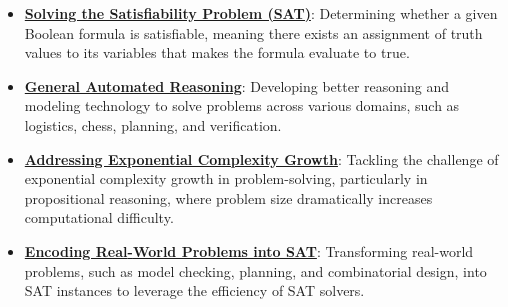 \documentclass{article}%
\begin{document}
\begin{itemize}[leftmargin=*]%
\item \href{https://purdue.brightspace.com/d2l/common/assets/pdfjs-d2l-dist/1.0.14-legacy/web/viewer.html?file=\%2Fcontent\%2Fenforced\%2F1095467-wl.202510.CS.24300.001\%2F15L2-SAT.pdf\%3Fou\%3D1095467\&lang=en-us\&container=d2l-fileviewer-rendered-pdf\&fullscreen=d2l-fileviewer-rendered-pdf-dialog\&height=667#page=2}{\textbf{Solving the Satisfiability Problem (SAT)}}: Determining whether a given Boolean formula is satisfiable, meaning there exists an assignment of truth values to its variables that makes the formula evaluate to true.%
\item \href{https://purdue.brightspace.com/d2l/common/assets/pdfjs-d2l-dist/1.0.14-legacy/web/viewer.html?file=\%2Fcontent\%2Fenforced\%2F1095467-wl.202510.CS.24300.001\%2F15L2-SAT.pdf\%3Fou\%3D1095467\&lang=en-us\&container=d2l-fileviewer-rendered-pdf\&fullscreen=d2l-fileviewer-rendered-pdf-dialog\&height=667#page=3}{\textbf{General Automated Reasoning}}: Developing better reasoning and modeling technology to solve problems across various domains, such as logistics, chess, planning, and verification.%
\item \href{https://purdue.brightspace.com/d2l/common/assets/pdfjs-d2l-dist/1.0.14-legacy/web/viewer.html?file=\%2Fcontent\%2Fenforced\%2F1095467-wl.202510.CS.24300.001\%2F15L2-SAT.pdf\%3Fou\%3D1095467\&lang=en-us\&container=d2l-fileviewer-rendered-pdf\&fullscreen=d2l-fileviewer-rendered-pdf-dialog\&height=667#page=4}{\textbf{Addressing Exponential Complexity Growth}}: Tackling the challenge of exponential complexity growth in problem-solving, particularly in propositional reasoning, where problem size dramatically increases computational difficulty.%
\item \href{https://purdue.brightspace.com/d2l/common/assets/pdfjs-d2l-dist/1.0.14-legacy/web/viewer.html?file=\%2Fcontent\%2Fenforced\%2F1095467-wl.202510.CS.24300.001\%2F15L2-SAT.pdf\%3Fou\%3D1095467\&lang=en-us\&container=d2l-fileviewer-rendered-pdf\&fullscreen=d2l-fileviewer-rendered-pdf-dialog\&height=667#page=6}{\textbf{Encoding Real{-}World Problems into SAT}}: Transforming real-world problems, such as model checking, planning, and combinatorial design, into SAT instances to leverage the efficiency of SAT solvers.%
\end{itemize}%
\end{document}
